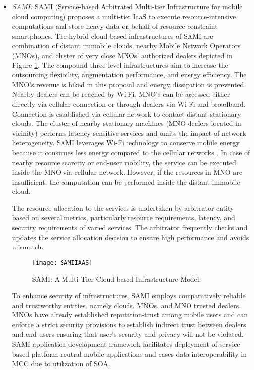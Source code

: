 \documentclass[publish]{IEEEtran}
\begin{document}
\begin{itemize}
\item \textit{SAMI:} 
SAMI (Service-based Arbitrated Multi-tier Infrastructure for mobile cloud computing) \cite{SAMI} proposes a multi-tier IaaS to execute resource-intensive computations and store heavy data on behalf of resource-constraint smartphones. The hybrid cloud-based infrastructures of SAMI are combination of distant immobile clouds, nearby Mobile Network Operators (MNOs), and cluster of very close MNOs’ authorized dealers depicted in Figure \ref{SAMI}. The compound three level infrastructures aim to increase the outsourcing flexibility, augmentation performance, and energy efficiency. The MNO's revenue is hiked in this proposal and energy dissipation is prevented. Nearby dealers can be reached by Wi-Fi. MNO's can be accessed either directly via cellular connection or through dealers via Wi-Fi and broadband. Connection is established via cellular network to contact distant stationary clouds.  The cluster of nearby stationary machines (MNO dealers located in vicinity) performs latency-sensitive services and omits the impact of network heterogeneity. SAMI leverages Wi-Fi technology to conserve mobile energy because it consumes less energy compared to the cellular networks \cite{Perrucci}. In case of nearby resource scarcity or end-user mobility, the service can be executed inside the MNO via cellular network. However, if the resources in MNO are insufficient, the computation can be performed inside the distant immobile cloud. 

The resource allocation to the services is undertaken by arbitrator entity based on several metrics, particularly resource requirements, latency, and security requirements of varied services. The arbitrator frequently checks and updates the service allocation decision to ensure high performance and avoids mismatch.

\begin{figure} [t]
\centering
\texttt{[image: SAMIIAAS]}
\caption{SAMI: A Multi-Tier Cloud-based Infrastructure Model.} \label{SAMI}
\end{figure}

To enhance security of infrastructures, SAMI employs comparatively reliable and trustworthy entities, namely clouds, MNOs, and MNO trusted dealers. MNOs have already established reputation-trust among mobile users and can enforce a strict security provisions to establish indirect trust between dealers and end users ensuring that user's security and privacy will not be violated. SAMI application development framework facilitates deployment of service-based platform-neutral mobile applications and eases data interoperability in MCC due to utilization of SOA.


\end{itemize}
\end{document}

